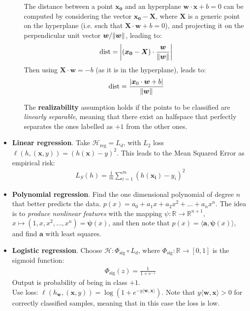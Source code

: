 \documentclass[../template.tex]{subfiles}
\begin{document}
\begin{itemize}
\begin{itemize}
        \begin{expl}
            The distance between a point $\bm{x_0}$ and an hyperplane $\bm{w} \cdot \bm{x} + b = 0$ can be computed by considering the vector $\bm{x_0} - \bm{X}$, where $\bm{X}$ is a generic point on the hyperplane (i.e. such that $\bm{X} \cdot \bm{w} + b= 0$), and projecting it on the perpendicular unit vector $\bm{w}/\norm{\bm{w}}$, leading to:
            \begin{align*}
                \operatorname{dist} = \left|(\bm{x_0} - \bm{X}) \cdot \frac{\bm{w}}{\norm{\bm{w}}}\right|
            \end{align*}
            Then using $\bm{X} \cdot \bm{w} = -b$ (as it is in the hyperplane), leads to:
            \begin{align} \label{eqn:hyperplane-dist}
                \operatorname{dist} = \frac{|\bm{x}_0 \cdot \bm{w} + b|}{\norm{\bm{w}}}  
            \end{align}
        \end{expl}
    The \textbf{realizability} assumption holds if the points to be classified are \textit{linearly separable}, meaning that there exist an halfspace that perfectly separates the ones labelled as $+1$ from the other ones.
    
    \end{itemize}
    \item \textbf{Linear regression}.  Take $\mathcal{H}_{\mathrm{reg}} = L_d$, with $L_2$ loss $\ell (h, (\bm{x}, y)) = (h(\bm{x}) - y)^2$. This leads to the Mean Squared Error as empirical risk:
    \begin{align*}
        L_S(h) = \frac{1}{m} \sum_{i=1}^m (h(\bm{x_i})- y_i)^2 
    \end{align*} 
    \item \textbf{Polynomial regression}. Find the one dimensional polynomial of degree $n$ that better predicts the data. $p(x) = a_0 + a_1 x + a_2 x^2 + \dots + a_nx^n$. The idea is to \textit{produce nonlinear features} with the mapping $\psi\colon \mathbb{R} \to \mathbb{R}^{n+1}$, $x \mapsto (1,x,x^2,\dots,x^n) = \bm{\psi}(x)$, and then note that $p(x) = \langle \bm{a}, \bm{\psi}(x) \rangle$, and find $\bm{a}$ with least squares.
    \item \textbf{Logistic regression}. Choose $\mathcal{H}\colon \Phi_
    \mathrm{sig} \circ L_d$, where $\Phi_{\mathrm{sig}}\colon \mathbb{R} \to [0,1]$ is the sigmoid function:
    \begin{align*}
        \Phi_{\mathrm{sig}}(z) = \frac{1}{1 + e^{-z}} 
    \end{align*}  
    Output is probability of being in class $+1$.\\
    Use loss: $\ell(h_{\bm{w}}, (\bm{x}, y)) = \log(1+ e^{-y \langle \bm{w}, \bm{x} \rangle})$. Note that $y \langle \bm{w}, \bm{x} \rangle > 0$ for correctly classified samples, meaning that in this case the loss is low.
\end{itemize}
\end{document}
